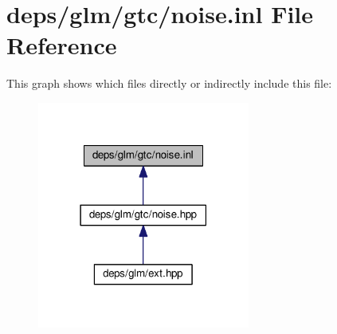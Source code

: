 \hypertarget{noise_8inl}{}\section{deps/glm/gtc/noise.inl File Reference}
\label{noise_8inl}
This graph shows which files directly or indirectly include this file\+:
\nopagebreak
\begin{figure}[H]
\begin{center}
\leavevmode
\includegraphics[width=198pt]{d6/d19/noise_8inl__dep__incl}
\end{center}
\end{figure}
